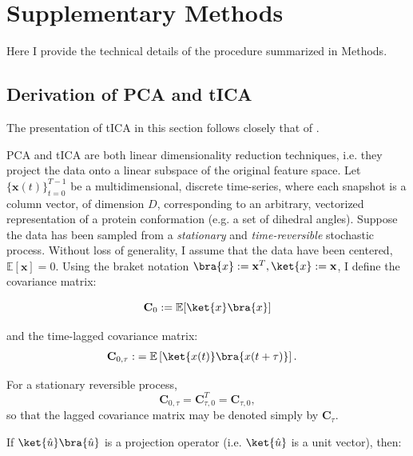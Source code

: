 \appendix


\section{Supplementary Methods}
\label{sec:SI_methods}
Here I provide the technical details of the procedure summarized in Methods.

\renewcommand{\thesubsection}{S\arabic{subsection}}
\setcounter{subsection}{0}

\subsection{Derivation of PCA and tICA}


\label{subsec:SI_dimred}
The presentation of tICA in this section follows closely that of \cite{my_tica_ref}.


PCA and tICA are both linear dimensionality reduction techniques, i.e. they project the data onto a linear subspace of the original feature space. 
Let $\{\mathbf{x}(t)\}_{t=0}^{T-1}$ be a multidimensional, discrete time-series, where each snapshot is a column vector, 
of dimension $D$, corresponding to an arbitrary, vectorized representation of a protein conformation (e.g. a set of dihedral angles). 
Suppose the data has been sampled from a \textit{stationary} and \textit{time-reversible} stochastic process. 
Without loss of generality, I assume that the data have been centered, $\mathbb E[\mathbf{x}] = 0 $. Using the braket notation $\bra{x} := \mathbf{x}^T, \ket{x} := \mathbf{x} $, I define the covariance matrix:


\begin{equation}
\mathbf{C}_0 := \mathbb{E}\!\left[\ket{x}\bra{x}\right]
\end{equation}

and the time-lagged covariance matrix:
\begin{align}
    \mathbf{C}_{0,\tau}:&= \mathbb{E}\left[\ket{x(t)}\bra{x(t + \tau)}\right].
\end{align}

For a stationary reversible process,
\begin{equation*}
\mathbf C_{0,\tau} = \mathbf C_{\tau,0}^{T} = \mathbf C_{\tau,0},
\end{equation*}
so that the lagged covariance matrix may be denoted simply by \(\mathbf C_\tau\).

If $\ket{\hat{u}}\bra{\hat{u}}$ is a projection operator (i.e. $\ket{\hat{u}}$ is a unit vector), then:

